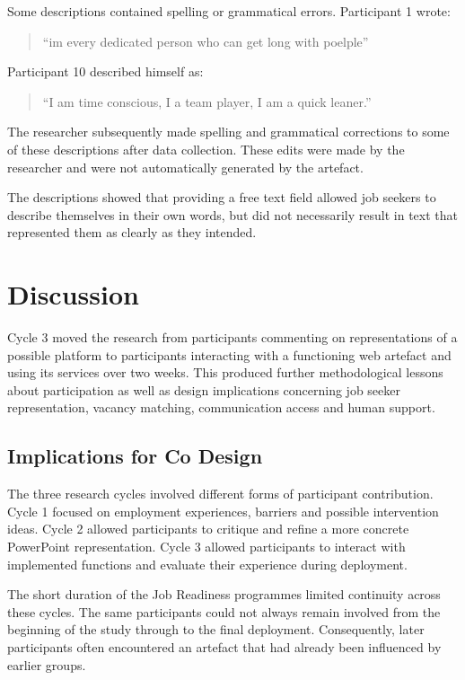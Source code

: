 Some descriptions contained spelling or grammatical errors. Participant 1 wrote:

\begin{quote}
``im every dedicated person who can get long with poelple''
\end{quote}

Participant 10 described himself as:

\begin{quote}
``I am time conscious, I a team player, I am a quick leaner.''
\end{quote}

The researcher subsequently made spelling and grammatical corrections to some of these descriptions after data collection. These edits were made by the researcher and were not automatically generated by the artefact.

The descriptions showed that providing a free text field allowed job seekers to describe themselves in their own words, but did not necessarily result in text that represented them as clearly as they intended.


\section{Discussion}

Cycle 3 moved the research from participants commenting on representations of a possible platform to participants interacting with a functioning web artefact and using its services over two weeks. This produced further methodological lessons about participation as well as design implications concerning job seeker representation, vacancy matching, communication access and human support.


\subsection{Implications for Co Design}

The three research cycles involved different forms of participant contribution. Cycle 1 focused on employment experiences, barriers and possible intervention ideas. Cycle 2 allowed participants to critique and refine a more concrete PowerPoint representation. Cycle 3 allowed participants to interact with implemented functions and evaluate their experience during deployment.

The short duration of the Job Readiness programmes limited continuity across these cycles. The same participants could not always remain involved from the beginning of the study through to the final deployment. Consequently, later participants often encountered an artefact that had already been influenced by earlier groups.

